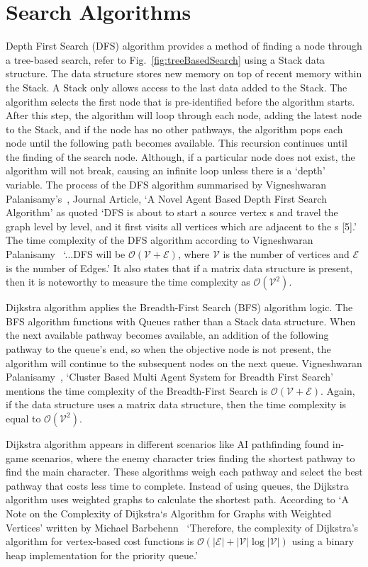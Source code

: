 \documentclass[conference]{IEEEtran}
\begin{document}
    \section{Search Algorithms}
      Depth First Search (DFS) algorithm provides a method of finding a node through a tree-based search, refer to Fig.~\ref{fig:treeBasedSearch} using a Stack data structure. The data structure stores new memory on top of recent memory within the Stack. A Stack only allows access to the last data added to the Stack. The algorithm selects the first node that is pre-identified before the algorithm starts. After this step, the algorithm will loop through each node, adding the latest node to the Stack, and if the node has no other pathways, the algorithm pops each node until the following path becomes available. This recursion continues until the finding of the search node. Although, if a particular node does not exist, the algorithm will not break, causing an infinite loop unless there is a `depth' variable. The process of the DFS algorithm summarised by Vigneshwaran Palanisamy's~\cite{palanisamy_novel_2020}, Journal Article, `A Novel Agent Based Depth First Search Algorithm' as quoted `DFS is about to start a source vertex s and travel the graph level by level, and it first visits all vertices which are adjacent to the s [5].' The time complexity of the DFS algorithm according to Vigneshwaran Palanisamy~\cite{palanisamy_novel_2020} `...DFS will be $\mathcal{O}(\mathcal{V}+\mathcal{E})$, where $\mathcal{V}$ is the number of vertices and $\mathcal{E}$ is the number of Edges.' It also states that if a matrix data structure is present, then it is noteworthy to measure the time complexity as $\mathcal{O}(\mathcal{V}^2)$.

      Dijkstra algorithm applies the Breadth-First Search (BFS) algorithm logic. The BFS algorithm functions with Queues rather than a Stack data structure. When the next available pathway becomes available, an addition of the following pathway to the queue's end, so when the objective node is not present, the algorithm will continue to the subsequent nodes on the next queue. Vigneshwaran Palanisamy~\cite{palanisamy_cluster_2020}, `Cluster Based Multi Agent System for Breadth First Search' mentions the time complexity of the Breadth-First Search is $\mathcal{O}(\mathcal{V} + \mathcal{E})$. Again, if the data structure uses a matrix data structure, then the time complexity is equal to $\mathcal{O}(\mathcal{V}^2)$.
            
      Dijkstra algorithm appears in different scenarios like AI pathfinding found in-game scenarios, where the enemy character tries finding the shortest pathway to find the main character. These algorithms weigh each pathway and select the best pathway that costs less time to complete. Instead of using queues, the Dijkstra algorithm uses weighted graphs to calculate the shortest path. According to `A Note on the Complexity of Dijkstra`s Algorithm for Graphs with Weighted Vertices' written by Michael Barbehenn~\cite{barbehenn_note_1998} `Therefore, the complexity of Dijkstra’s algorithm for vertex-based cost functions is $\mathcal{O}(|\mathcal{E}| + |\mathcal{V}| \log |\mathcal{V}|)$ using a binary
      heap implementation for the priority queue.' 
\end{document}
